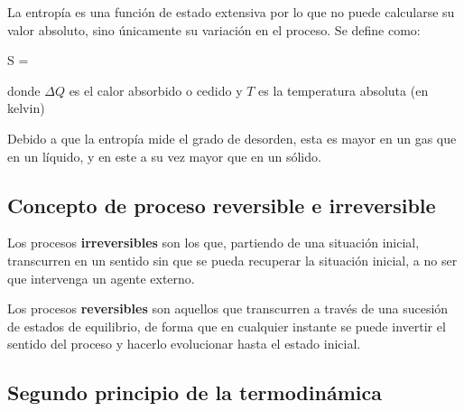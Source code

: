 La entropía es una función de estado extensiva por lo que no puede calcularse su valor absoluto, sino únicamente su variación en el proceso.
Se define como:
\begin{centeredequation}
    \Delta S = \label{eq:segundo-principio-termodinamica}
\end{centeredequation}


donde \(\Delta Q\) es el calor absorbido o cedido y \(T\) es la temperatura absoluta (en kelvin)

Debido a que la entropía mide el grado de desorden, esta es mayor en un gas que en un líquido, y en este a su vez mayor que en un sólido.

\subsection{Concepto de proceso reversible e irreversible}\label{subsec:concepto-de-proceso-reversible-e-irreversible}

Los procesos \textbf{irreversibles} son los que, partiendo de una situación inicial, transcurren en un sentido sin que se pueda recuperar la situación inicial, a no ser que intervenga un agente externo.

Los procesos \textbf{reversibles} son aquellos que transcurren a través de una sucesión de estados de equilibrio, de forma que en cualquier instante se puede invertir el sentido del proceso y hacerlo evolucionar hasta el estado inicial.

\subsection{Segundo principio de la termodinámica}\label{subsec:segundo-principio-de-la-termodinamica}

%
%
%
%
%
%
%

